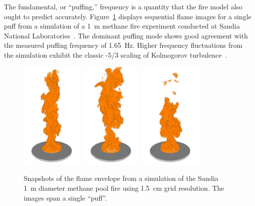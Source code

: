 \documentclass[graybox]{svmult}
\begin{document}
The fundamental, or ``puffing,'' frequency is a quantity that the fire model also ought to predict accurately. Figure~\ref{Sandia_Simulation} displays sequential flame images for a single puff from a simulation of a 1~m methane fire experiment conducted at Sandia National Laboratories~\cite{Tieszen:2002}. The dominant puffing mode shows good agreement with the measured puffing frequency of 1.65~Hz. Higher frequency fluctuations from the simulation exhibit the classic -5/3 scaling of Kolmogorov turbulence~\cite{Pope:2000}.
\begin{figure}[ht]
\begin{center}
\includegraphics[width=1.2in]{Fig_fire_1}
\includegraphics[width=1.2in]{Fig_fire_2}
\includegraphics[width=1.2in]{Fig_fire_3}
\end{center}
\caption{Snapshots of the flame envelope from a simulation of the Sandia 1~m diameter methane pool fire using 1.5~cm grid resolution.  The images span a single ``puff''.}
\label{Sandia_Simulation}
\end{figure}
\end{document}
